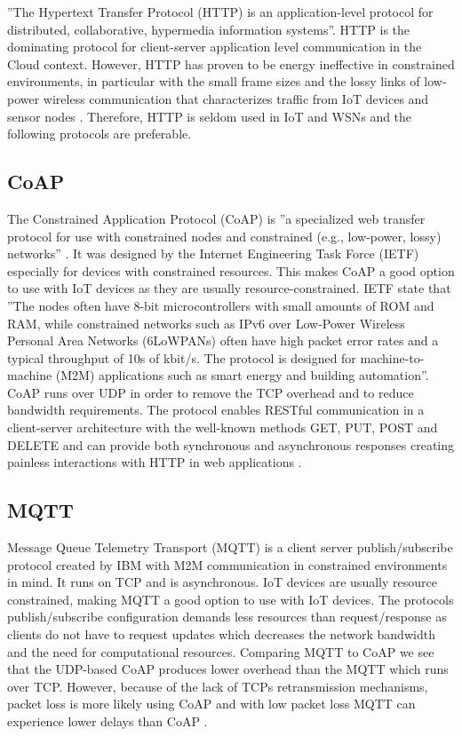 \documentclass[]{uiophd}
\begin{document}
''The Hypertext Transfer Protocol (HTTP) is an application-level protocol for distributed, collaborative, hypermedia information systems''\cite{HTTP1996}. HTTP is the dominating protocol for client-server application level communication in the Cloud context. However, HTTP has proven to be energy ineffective in constrained environments, in particular with the small frame sizes and the lossy links of low-power wireless communication that characterizes traffic from IoT devices and sensor nodes \cite{karagiannis2015survey} \cite{7030106}. Therefore, HTTP is seldom used in IoT and WSNs and the following protocols are preferable.

\subsection{CoAP}
The Constrained Application Protocol (CoAP) is ''a specialized web transfer protocol for use with constrained nodes and constrained (e.g., low-power, lossy) networks'' \cite{rfc7252}. It was designed by the Internet Engineering Task Force (IETF) especially for devices with constrained resources. This makes CoAP a good option to use with IoT devices as they are usually resource-constrained. IETF state that ''The nodes often have 8-bit microcontrollers with small amounts of ROM and RAM, while constrained networks such as IPv6 over Low-Power Wireless Personal Area Networks (6LoWPANs) often have high packet error rates and a typical throughput of 10s of kbit/s.  The protocol is designed for machine-to-machine (M2M) applications such as smart energy and building automation''\cite{rfc7252}. CoAP runs over UDP in order to remove the TCP overhead and to reduce bandwidth requirements. The protocol enables RESTful communication in a client-server architecture with the well-known methods GET, PUT, POST and DELETE and can provide both synchronous and asynchronous responses creating painless interactions with HTTP in web applications
\cite{rfc7252}
\cite{karagiannis2015survey}
\cite{7030106}.

\subsection{MQTT}
Message Queue Telemetry Transport (MQTT) is a client server publish/subscribe protocol created by IBM with M2M communication in constrained environments in mind. It runs on TCP and is asynchronous. IoT devices are usually resource constrained, making MQTT a good option to use with IoT devices. The protocols publish/subscribe configuration demands less resources than request/response as clients do not have to request updates which decreases the network bandwidth and the need for computational resources. Comparing MQTT to CoAP we see that the UDP-based CoAP produces lower overhead than the MQTT which runs over TCP. However, because of the lack of TCPs retransmission mechanisms, packet loss is more likely using CoAP and with low packet loss MQTT can experience lower delays than CoAP \cite{karagiannis2015survey}.
\end{document}
